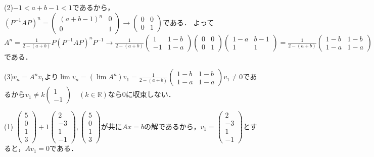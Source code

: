 \documentclass[
		book,
		head_space=20mm,
		foot_space=20mm,
		gutter=10mm,
		line_length=190mm
]{jlreq}
\begin{document}
(2)$-1<a+b-1<1$であるから，
$(P^{-1}AP)^n=\begin{pmatrix}
(a+b-1)^n&0\\
0&1
\end{pmatrix}\rightarrow \begin{pmatrix}
0&0\\
0&1
\end{pmatrix}$である．
よって$A^n=\frac{1}{2-(a+b)}P(P^{-1}AP)^nP^{-1}\rightarrow \frac{1}{2-(a+b)}\begin{pmatrix}
1&1-b\\
-1&1-a
\end{pmatrix} \begin{pmatrix}
0&0\\
0&1
\end{pmatrix}\begin{pmatrix}
1-a&b-1\\
1&1
\end{pmatrix}=\frac{1}{2-(a+b)}\begin{pmatrix}
1-b&1-b\\
1-a&1-a
\end{pmatrix}$である．

(3)$v_n=A^nv_1$より$\lim v_n =(\lim A^n)v_1=\frac{1}{2-(a+b)}\begin{pmatrix}
1-b&1-b\\
1-a&1-a
\end{pmatrix}v_1\neq 0$であるから$v_1\neq k \begin{pmatrix}
1\\-1
\end{pmatrix}\quad(k\in \mathbb{R})$なら$0$に収束しない．

(1)
$\begin{pmatrix}
5\\0\\1\\3
\end{pmatrix}+1\begin{pmatrix}
2\\-3\\1\\-1
\end{pmatrix},\begin{pmatrix}
5\\0\\1\\3
\end{pmatrix}$が共に$Ax=b$の解であるから，$v_1=\begin{pmatrix}
2\\-3\\1\\-1
\end{pmatrix}$とすると，$Av_1=0$である．
\end{document}

